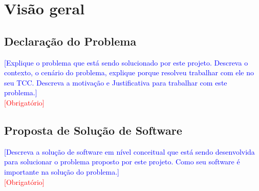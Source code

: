 \documentclass[11pt]{relatorio_tcc_ads_ifba}
\begin{document}


\date{21 de janeiro de 2024}



\pretextual

\section{Visão geral }




\subsection{Declaração do Problema}
\textcolor{blue}{
    [Explique o problema que está sendo solucionado por este projeto. Descreva o contexto, o cenário do problema, explique porque resolveu trabalhar com ele no seu TCC. Descreva a motivação e Justificativa para trabalhar com este problema.]
} \\
\textcolor{red}{[Obrigatório]}

\subsection{Proposta de Solução de Software}
\textcolor{blue}{
    [Descreva a solução de software em nível conceitual que está sendo desenvolvida para solucionar o problema proposto por este projeto. Como seu software é importante na solução do problema.]
} \\
\textcolor{red}{[Obrigatório]}
\end{document}
